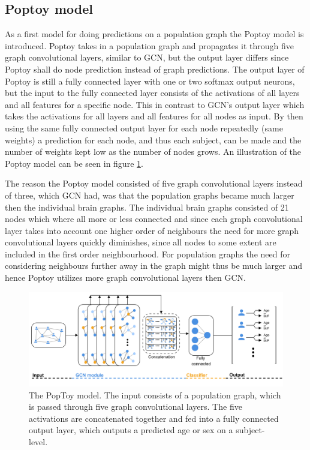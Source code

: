 \subsection{Poptoy model}
As a first model for doing predictions on a population graph the Poptoy model is introduced. Poptoy takes in a population graph and propagates it through five graph convolutional layers, similar to GCN, but the output layer differs since Poptoy shall do node prediction instead of graph predictions. The output layer of Poptoy is still a fully connected layer with one or two softmax output neurons, but the input to the fully connected layer consists of the activations of all layers and all features for a specific node. This in contrast to GCN's output layer which takes the activations for all layers and all features for all nodes as input. By then using the same fully connected output layer for each node repeatedly (same weights) a prediction for each node, and thus each subject, can be made and the number of weights kept low as the number of nodes grows. An illustration of the Poptoy model can be seen in figure \ref{fig:poptoy}.

The reason the Poptoy model consisted of five graph convolutional layers instead of three, which GCN had, was that the population graphs became much larger then the individual brain graphs. The individual brain graphs consisted of 21 nodes which where all more or less connected and since each graph convolutional layer takes into account one higher order of neighbours the need for more graph convolutional layers quickly diminishes, since all nodes to some extent are included in the first order neighbourhood. For population graphs the need for considering neighbours further away in the graph might thus be much larger and hence Poptoy utilizes more graph convolutional layers then GCN. 

\begin{figure}[H]
    \centering
    \includegraphics[width=\textwidth]{chapters/images_methods/poptoy_v2.png}
    \caption{The PopToy model. The input consists of a population graph, which is passed through five graph convolutional layers. The five activations are concatenated together and fed into a fully connected output layer, which outputs a predicted age or sex on a subject-level.}
    \label{fig:poptoy}
\end{figure}

